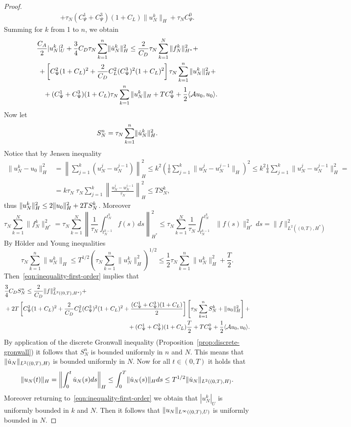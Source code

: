 \documentclass[a4paper,10pt,twoside]{amsbook}
\numberwithin{section}{chapter}
\numberwithin{equation}{chapter}
\theoremstyle{definition}
\DeclarePairedDelimiter{\norm}{\lVert}{\rVert}
\DeclarePairedDelimiter{\dual}{\langle}{\rangle}
\begin{document}
\begin{proof}
\[\begin{multlined}
+\tau_N(C_\Psi^1+C_\Psi^3)(1+C_L)\|u_N^k\|_H+\tau_NC_\Psi^0.
\end{multlined}
\]
Summing for $k$ from 1 to $n$, we obtain
\begin{equation}
\label{eqn:inequality-first-order}
\begin{multlined}
\frac{C_A}{2}|u_N^k|_U^2+\frac{3}{4}C_D\tau_N\sum_{k=1}^n\norm{\dot u_N^k}_H^2\le\frac{2}{C_D}\tau_N\sum_{k=1}^N\|f_N^k\|_{H^*}^2+\\
+\left[C_\Psi^2(1+C_L)^2+\frac{2}{C_D}C_L^2(C_\Psi^3)^2(1+C_L)^2\right]\tau_N\sum_{k=1}^n\|u_N^k\|_H^2+\\
+(C_\Psi^1+C_\Psi^3)(1+C_L)\tau_N\sum_{k=1}^n\|u_N^k\|_H+TC_\Psi^0+\frac{1}{2}\dual{\mathcal{A}u_0,u_0}.
\end{multlined}
\end{equation}
Now let
\[
S_N^n=\tau_N\sum_{k=1}^n\norm{\dot u_N^k}_H^2.
\]
Notice that by Jensen inequality
\[
\begin{split}
\|u_N^k-u_0\|_H^2&=\left\|\sum_{j=1}^k({u}_N^j-{u}_N^{j-1})\right\|_H^2\le k^2\left(\frac{1}{k}\sum_{j=1}^k\|{u}_N^j-{u}_N^{j-1}\|_H\right)^2\le k^2\frac{1}{k}\sum_{j=1}^k\|{u}_N^j-{u}_N^{j-1}\|_H^2=\\
&=k\tau_N\;\tau_N\sum_{j=1}^k\left\|\frac{{u}_N^j-{u}_N^{j-1}}{\tau_N}\right\|_H^2\le TS_N^k,
\end{split}
\]
thus $\norm{u_N^k}_H^2\le2\norm{u_0}_H^2+2TS_N^k$. Moreover
\[
\tau_N\sum_{k=1}^N\|f_N^k\|_{H^*}^2=\tau_N\sum_{k=1}^N\left\|\frac{1}{\tau_N}\int_{t_N^{k-1}}^{t_N^k}f(s)\,ds\right\|_{H^*}^2\le\tau_N\sum_{k=1}^N\frac{1}{\tau_N}\int_{t_N^{k-1}}^{t_N^k}\|f(s)\|_{H^*}^2\,ds=\|f\|_{L^2((0,T),H^*)}^2
\]
By H\"older and Young inequalities
\[
\tau_N\sum_{k=1}^n\|u_N^k\|_H\le T^{1/2}\left(\tau_N\sum_{k=1}^n\|u_N^k\|_H^2\right)^{1/2}\le\frac{1}{2}\tau_N\sum_{k=1}^n\|u_N^k\|_H^2+\frac{T}{2}.
\]
Then~\eqref{eqn:inequality-first-order} implies that
\[
\begin{multlined}
\frac{3}{4}C_DS_N^n\le\frac{2}{C_D}\|f\|_{L^2((0,T),H^*)}^2+\\
+2T\left[C_\Psi^2(1+C_L)^2+\frac{2}{C_D}C_L^2(C_\Psi^3)^2(1+C_L)^2+\frac{(C_\Psi^1+C_\Psi^3)(1+C_L)}{2}\right]\left[\tau_N\sum_{k=1}^nS_N^k+\norm{u_0}_H^2\right]+\\
+(C_\Psi^1+C_\Psi^3)(1+C_L)\frac{T}{2}+TC_\Psi^0+\frac{1}{2}\dual{\mathcal{A}u_0,u_0}.
\end{multlined}
\]
By application of the discrete Gronwall inequality (Proposition~\ref{prop:discrete-gronwall}) it follows that $S_N^n$ is bounded uniformly in $n$ and $N$. This means that $\norm{\dot u_N}_{L^2((0,T),H)}$ is bounded uniformly in $N$. Now for all $t\in(0,T)$ it holds that
\[
\norm{u_N(t)}_H=\left\|\int_0^t\dot u_N(s)ds\right\|_H\le\int_0^T\norm{\dot u_N(s)}_Hds\le T^{1/2}\norm{\dot u_N}_{L^2((0,T),H)}.
\]
Moreover returning to~\eqref{eqn:inequality-first-order} we obtain that $|u_N^k|_U$ is uniformly bounded in $k$ and $N$. Then it follows that $\norm{u_N}_{L^\infty((0,T),U)}$ is uniformly bounded in $N$.
\end{proof}
\end{document}
